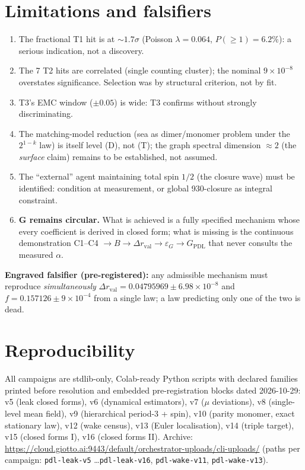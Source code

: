 \documentclass[11pt,a4paper]{article}
\newcommand{\Dr}{\Delta r_{\mathrm{val}}}
\begin{document}
\section{Limitations and falsifiers}\label{sec:limits}
\begin{enumerate}[leftmargin=1.8em]
\item The fractional T1 hit is at $\sim 1.7\sigma$ (Poisson $\lambda = 0.064$, $P(\geq 1) = 6.2\%$): a serious indication, not a discovery.
\item The 7 T2 hits are correlated (single counting cluster); the nominal $9\times10^{-8}$ overstates significance. Selection was by structural criterion, not by fit.
\item T3's EMC window ($\pm 0.05$) is wide: T3 confirms without strongly discriminating.
\item The matching-model reduction (sea as dimer/monomer problem under the $2^{1-k}$ law) is itself level (D), not (T); the graph spectral dimension $\approx 2$ (the \emph{surface} claim) remains to be established, not assumed.
\item The ``external'' agent maintaining total spin $1/2$ (the closure wave) must be identified: condition at measurement, or global 930-closure as integral constraint.
\item \textbf{G remains circular.} What is achieved is a fully specified mechanism whose every coefficient is derived in closed form; what is missing is the continuous demonstration C1--C4 $\to B \to \Dr \to \varepsilon_G \to G_{\mathrm{PDL}}$ that never consults the measured $\alpha$.
\end{enumerate}
\noindent\textbf{Engraved falsifier (pre-registered):} any admissible mechanism must reproduce \emph{simultaneously} $\Dr = 0.04795969 \pm 6.98\times10^{-8}$ and $f = 0.157126 \pm 9\times10^{-4}$ from a single law; a law predicting only one of the two is dead.

\section{Reproducibility}
All campaigns are stdlib-only, Colab-ready Python scripts with declared families printed before resolution and embedded pre-registration blocks dated 2026-10-29: v5 (leak closed forms), v6 (dynamical estimators), v7 ($\mu$ deviations), v8 (single-level mean field), v9 (hierarchical period-3 + spin), v10 (parity monomer, exact stationary law), v12 (wake census), v13 (Euler localisation), v14 (triple target), v15 (closed forms I), v16 (closed forms II). Archive: \url{https://cloud.giotto.ai:9443/default/orchestrator-uploads/cli-uploads/} (paths per campaign: \texttt{pdl-leak-v5} \dots \texttt{pdl-leak-v16}, \texttt{pdl-wake-v11}, \texttt{pdl-wake-v13}).
\end{document}
